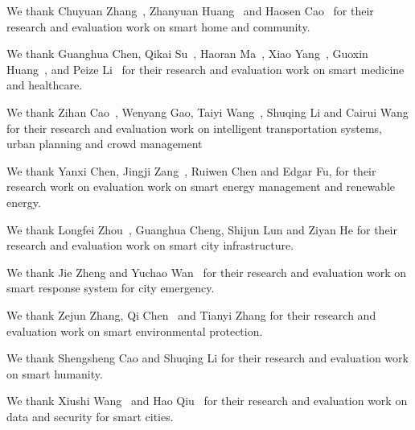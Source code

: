 \documentclass[letterpaper, twocolumn, 10pt, conference]{IEEEtran}
\begin{document}
We thank Chuyuan Zhang~\cite{uv2018-smarthome-zhang.chuyuan}, Zhanyuan Huang~\cite{uv2018-smarthome-huang.zhanyuan} and Haosen Cao~\cite{uv2018-smarthome-cao.haosen} for their research and evaluation work on smart home and community. 

We thank Guanghua Chen, Qikai Su~\cite{uv2018-healthcare-su.qikai}, Haoran Ma~\cite{uv2018-healthcare-ma.haoran}, Xiao Yang~\cite{uv2018-healthcare-yang.xiao}, Guoxin Huang~\cite{uv2018-healthcare-huang.guoxin}, and Peize Li~\cite{uv2018-healthcare-li.peize} for their research and evaluation work on smart medicine and healthcare.

We thank Zihan Cao~\cite{uv2018-its-cao.zihan}, Wenyang Gao, Taiyi Wang~\cite{uv2018-its-wang.taiyi}, Shuqing Li and Cairui Wang for their research and evaluation work on intelligent transportation systems, urban planning and crowd management

We thank Yanxi Chen, Jingji Zang~\cite{uv2018-smartenergy-zang.jingji}, Ruiwen Chen and Edgar Fu, for their research work on evaluation work on smart energy management and renewable energy. 

We thank Longfei Zhou~\cite{uv2018-cloudmanufacturing-zhou.longfei}, Guanghua Cheng, Shijun Lun and Ziyan He for their research and evaluation work on smart city infrastructure. 

We thank Jie Zheng and Yuchao Wan~\cite{uv2018-cityemergency-wan.yuchao} for their research and evaluation work on smart response system for city emergency.

We thank Zejun Zhang, Qi Chen~\cite{uv2018-smartenvironment-chen.qi} and Tianyi Zhang for their research and evaluation work on smart environmental protection. 

We thank Shengsheng Cao and Shuqing Li for their research and evaluation work on smart humanity. 

We thank Xiushi Wang~\cite{uv2018-smartdata-wang.xiushi} and Hao Qiu~\cite{uv2018-smartdata-qiu.hao} for their research and evaluation work on data and security for smart cities. 


\printbibliography
\end{document}

